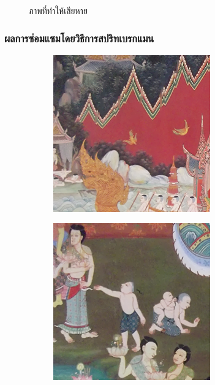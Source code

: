 \documentclass[xcolor=dvipsnames, xetex,serif]{beamer}
\numberwithin{equation}{section}
\begin{document}
\begin{frame}
\begin{figure}[H]
\begin{subfigure}{0.3\linewidth}
				\end{subfigure}
				\caption{ภาพที่ทำให้เสียหาย}
			\end{figure}
		\end{frame}
		\begin{frame}
			\frametitle{ผลการซ่อมแซมโดยวิธีการสปริทเบรกแมน}
			\begin{figure}[H]
				\centering
				\begin{subfigure}{0.3\linewidth}
					\centering
					\includegraphics[width=0.7\linewidth]{images/result_ex4/splitbergman_case01.png}
				\end{subfigure}
				\begin{subfigure}{0.3\linewidth}
					\centering
					\includegraphics[width=0.7\linewidth]{images/result_ex4/splitbergman_case02.png}
				\end{subfigure}

\end{figure}
\end{frame}
\end{document}
